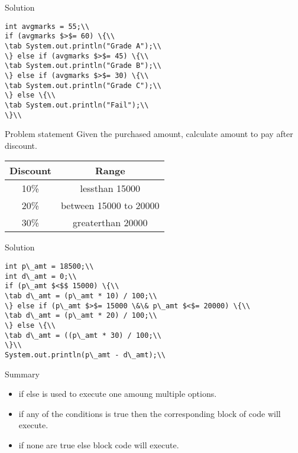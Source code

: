\documentclass[aspectratio=169,14pt,usenames,dvipsnames]{beamer}
\newcommand\tab[1][1cm]{\hspace*{#1}}
\begin{document}
\begin{frame}{Solution}
\begin{lstlisting}
int avgmarks = 55;\\
if (avgmarks $>$= 60) \{\\
\tab System.out.println("Grade A");\\
\} else if (avgmarks $>$= 45) \{\\
\tab System.out.println("Grade B");\\
\} else if (avgmarks $>$= 30) \{\\
\tab System.out.println("Grade C");\\
\} else \{\\
\tab System.out.println("Fail");\\
\}\\
\end{lstlisting}
\end{frame}

\begin{frame}{Problem statement}
Given the purchased amount, calculate
amount to pay after discount.
\begin{center}
\begin{tabular}{|c|c|}
\hline 
\textbf{Discount} & \textbf{Range}\\
\hline
10\% & lessthan 15000\\
\hline
20\% & between 15000 to 20000\\
\hline
30\% & greaterthan 20000\\
\hline
\end{tabular} 
\end{center}
\end{frame}

\begin{frame}{Solution}
\begin{lstlisting}
int p\_amt = 18500;\\
int d\_amt = 0;\\
if (p\_amt $<$$ 15000) \{\\
\tab d\_amt = (p\_amt * 10) / 100;\\
\} else if (p\_amt $>$= 15000 \&\& p\_amt $<$= 20000) \{\\
\tab d\_amt = (p\_amt * 20) / 100;\\
\} else \{\\
\tab d\_amt = ((p\_amt * 30) / 100;\\
\}\\
System.out.println(p\_amt - d\_amt);\\
\end{lstlisting}
\end{frame}


\begin{frame}{Summary}
\begin{itemize}
    \item if else is used to execute one amoung
multiple options.
\item if any of the conditions is true then the
corresponding block of code will execute.
\item if none are true else block code will execute.

\end{itemize}
\end{frame}
\end{document}
